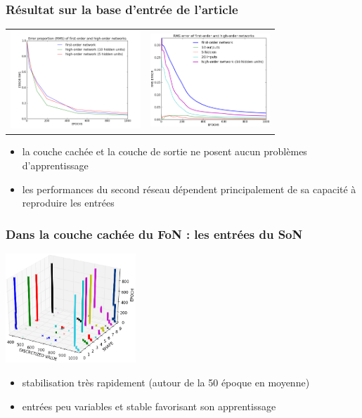 \documentclass[11pt]{beamer}
\begin{document}
\begin{frame}
  \frametitle{Résultat sur la base d'entrée de l'article}
  \begin{center}
  \begin{tabular}{cc}
  \hspace*{-1cm}
   \includegraphics[width=185px]{../cleeremans_2007/digit_reco/rms.png}
   &
   \hspace*{-0.5cm}
   \includegraphics[width=170px]{../cleeremans_2007/digit_reco/rms_ffa.png}
  \end{tabular}
  \end{center}

\begin{itemize}
 \item la couche cachée et la couche de sortie ne posent aucun problèmes d'apprentissage
 \item les performances du second réseau dépendent principalement de sa capacité à reproduire les entrées
\end{itemize}
\end{frame}


\begin{frame}
  \frametitle{Dans la couche cachée du FoN : les entrées du SoN}
  \begin{center}
   \includegraphics[width=185px]{../cleeremans_2007/digit_reco/discretize_cloud.png}
  \end{center}

\begin{itemize}
 \item stabilisation très rapidement (autour de la 50 époque en moyenne)
 \item entrées peu variables et stable favorisant son apprentissage
\end{itemize}
\end{frame}
\end{document}
